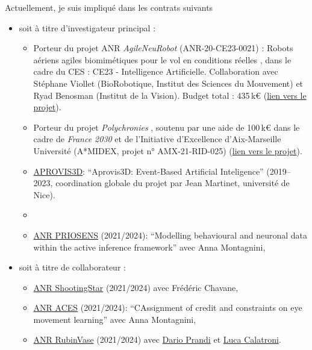 \documentclass[10pt,french,a4paper,oneside]{article}%
\begin{document}
Actuellement, je suis impliqué dans les contrats suivants
\begin{itemize}
\item soit à titre d'investigateur principal :
\begin{itemize}

	\item Porteur du projet ANR \og \textit{AgileNeuRobot} \fg{} (ANR-20-CE23-0021) : \og Robots aériens agiles biomimétiques pour le vol en conditions réelles \fg{}, dans le cadre du CES : CE23 - Intelligence Artificielle. Collaboration avec Stéphane Viollet (BioRobotique, Institut des Sciences du Mouvement) et Ryad Benosman (Institut de la Vision). Budget total : 435\,k€ (\href{https://laurentperrinet.github.io/grant/anr-anr/}{lien vers le projet}).

	\item Porteur du projet \og \textit{Polychronies} \fg{}, soutenu par une aide de 100\,k€ dans le cadre de \textit{France 2030} et de l’Initiative d’Excellence d’Aix-Marseille Université (A*MIDEX, projet n° AMX-21-RID-025) (\href{https://laurentperrinet.github.io/grant/polychronies/}{lien vers le projet}).

	\item  \href{https://laurentperrinet.github.io/grant/aprovis-3-d/}{APROVIS3D}: ``Aprovis3D: Event-Based Artificial Inteligence'' (2019--2023, coordination globale du projet par Jean Martinet, université de Nice).
	\item 
 	\item \href{https://laurentperrinet.github.io/grant/anr-priosens/}{ANR PRIOSENS} (2021/2024): ``Modelling behavioural and neuronal data within the active inference framework'' avec Anna Montagnini,
\end{itemize}
\item soit à titre de collaborateur :

\begin{itemize}
 \item \href{https://laurentperrinet.github.io/grant/anr-shootingstar/}{ANR ShootingStar} (2021/2024) avec Frédéric Chavane,
 \item \href{https://laurentperrinet.github.io/grant/anr-aces/}{ANR ACES} (2021/2024): ``CAssignment of credit and constraints on eye movement learning'' avec Anna Montagnini,
 \item \href{https://laurentperrinet.github.io/grant/anr-predicteye/}{ANR RubinVase} (2021/2024) avec \href{https://scholar.google.com/citations?user=22p8Wc4AAAAJ}{Dario Prandi} et \href{https://scholar.google.com/citations?user=dRVPKmkAAAAJ}{Luca Calatroni}.
\end{itemize}


\end{itemize}
\end{document}
